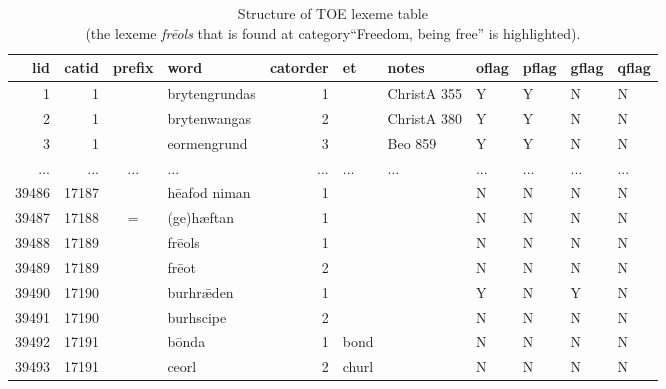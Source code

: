 \begin{table}[ht]
	\normalsize
	\center
	\setlength\tabcolsep{0.13em}
	\begin{tabular}{|r|r|c|l|r|l|l|l|l|l|l|}
		\hline
		\normalfont \bfseries lid & \normalfont \bfseries catid & \normalfont \bfseries prefix & \normalfont \bfseries word & \normalfont \bfseries catorder & \normalfont \bfseries et & \normalfont \bfseries notes & \normalfont \bfseries oflag & \normalfont \bfseries pflag & \normalfont \bfseries gflag & \normalfont \bfseries qflag \\ \hline
		1 & 1 & & brytengrundas & 1 & & ChristA 355 & Y & Y & N & N \\ \hline
		2 & 1 & & brytenwangas & 2 & & ChristA 380 & Y & Y & N & N \\ \hline
		3 & 1 & & eormengrund & 3 & & Beo 859 & Y & Y & N & N \\ \hline
		... & ... & ... & ... & ... & ... & ... & ... & ... & ... & ... \\ \hline
		39486 & 17187 & & hēafod niman & 1 & & & N & N & N & N \\ \hline
		39487 & 17188 & = & (ge)hæftan & 1 & & & N & N & N & N \\ \hline
\rowcolor{yellow}
		39488 & 17189 & & frēols & 1 & & & N & N & N & N \\ \hline
		39489 & 17189 & & frēot & 2 & & & N & N & N & N \\ \hline
		39490 & 17190 & & burhrǣden & 1 & & & Y & N & Y & N \\ \hline
		39491 & 17190 & & burhscipe & 2 & & & N & N & N & N \\ \hline
		39492 & 17191 & & bōnda & 1 & bond & & N & N & N & N \\ \hline
		39493 & 17191 & & ceorl & 2 & churl & & N & N & N & N \\ \hline
	\end{tabular}
	\caption{Structure of TOE lexeme table\\
(the lexeme \textit{frēols} that is found at category“Freedom, being free” is highlighted).\label{table:Stolk2019b:TOEtable-lexeme}}
\end{table}

